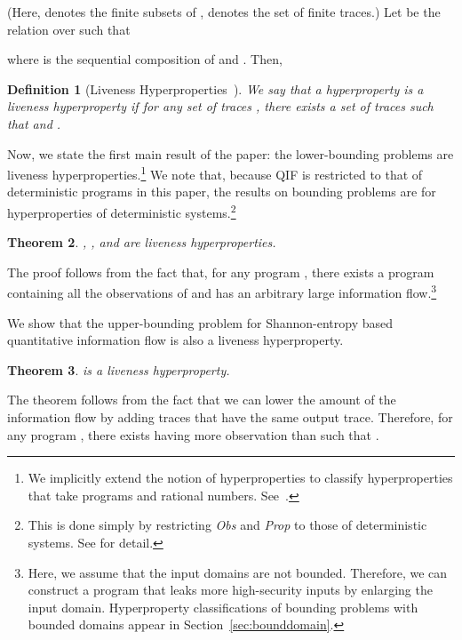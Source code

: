 \documentclass[]{eptcs}
\newtheorem{theorem}{Theorem}[section]
\newtheorem{definition}[theorem]{Definition}
\begin{document}
(Here,  denotes the finite subsets of ,
 denotes the set of finite traces.)  Let 
be the relation over  such that

where  is the sequential composition of  and .
Then,
\begin{definition}[Liveness
  Hyperproperties~\cite{DBLP:journals/jcs/ClarksonS10}]
  We say that a hyperproperty  is a liveness hyperproperty if for
  any set of traces , there exists a set of traces
   such that  and .
\end{definition}

Now, we state the first main result of the paper: the lower-bounding
problems are liveness hyperproperties.\footnote{We implicitly extend
  the notion of hyperproperties to classify hyperproperties that take
  programs and rational numbers.
  See~\cite{DBLP:conf/esorics/YasuokaT10}.}  We note that, because QIF
is restricted to that of deterministic programs in this paper, the
results on bounding problems are for hyperproperties of deterministic
systems.\footnote{This is done simply by restricting {\it Obs} and
  {\it Prop} to those of deterministic systems.  See
  \cite{DBLP:journals/jcs/ClarksonS10} for detail.}
\begin{theorem}
\label{thm:Llp}
, , and  are liveness hyperproperties.
\end{theorem}
The proof follows from the fact that, for any program , there
exists a program  containing all the observations of  and has
an arbitrary large information flow.\footnote{Here, we assume that the
  input domains are not bounded.  Therefore, we can construct a
  program that leaks more high-security inputs by enlarging the input
  domain.  Hyperproperty classifications of bounding problems with
  bounded domains appear in Section~\ref{sec:bounddomain}.}

We show that the upper-bounding problem for Shannon-entropy based
quantitative information flow is also a liveness hyperproperty.
\begin{theorem}
\label{thm:USElp}
 is a liveness hyperproperty.
\end{theorem}
The theorem follows from the fact that we can lower the amount of the
information flow by adding traces that have the same output trace.
Therefore, for any program , there exists  having more
observation than  such that .
\end{document}
